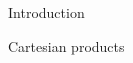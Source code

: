 \documentclass[12pt]{amsart}
\theoremstyle{definition}
\begin{document}
\begin{section}{Introduction}
\begin{section}{Cartesian products}
    
    


\end{section}
\end{section}
\end{document}
